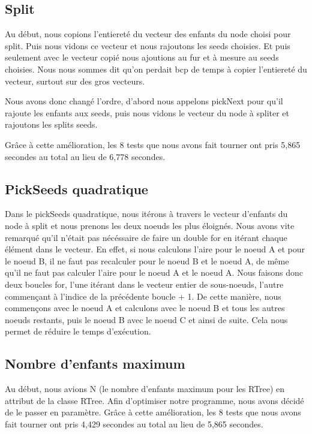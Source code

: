 \documentclass[utf8]{article}
\begin{document}
\begin{large}
  \subsection{Split}
  \indent

  \par
  Au début, nous copions l'entiereté du vecteur des enfants du node choisi pour
  split. Puis nous vidons ce vecteur et nous rajoutons les seeds choisies. Et puis
  seulement avec le vecteur copié nous ajoutions au fur et à mesure au seeds
  choisies. Nous nous sommes dit qu'on perdait bcp de temps à copier l'entiereté
  du vecteur, surtout sur des gros vecteurs.

  Nous avons donc changé l'ordre, d'abord nous appelons pickNext pour qu'il
  rajoute les enfants aux seeds, puis nous vidons le vecteur du node à spliter et
  rajoutons les splits seeds.

  Grâce à cette amélioration, les 8 tests que nous avons fait tourner ont pris
  5,865 secondes au total au lieu de 6,778 secondes.
  \par
  \subsection{PickSeeds quadratique}
  \indent
  \par
  Dans le pickSeeds quadratique, nous itérons à travers le vecteur d'enfants du node à
  split et nous prenons les deux noeuds les plus éloignés. Nous avons vite
  remarqué qu'il n'était pas nécéssaire de faire un double for en itérant chaque
  élément dans le vecteur. En effet, si nous calculons l'aire pour le noeud A
  et pour le noeud B, il ne faut pas recalculer pour le noeud B et le noeud A, de
  même qu'il ne faut pas calculer l'aire pour le noeud A et le noeud A. Nous
  faisons donc deux boucles for, l'une itérant dans le vecteur entier de
  sous-noeuds, l'autre commençant à l'indice de la précédente boucle + 1. De cette
  manière, nous commençons avec le noeud A et calculons avec le noeud B et tous
  les autres noeuds restants, puis le noeud B avec le noeud C et ainsi de suite. Cela nous permet de réduire le temps d'exécution.

  \subsection{Nombre d'enfants maximum}
  \indent
  \par
  Au début, nous avions N (le nombre d'enfants maximum pour les RTree) en
  attribut de la classe RTree. Afin d'optimiser notre programme, nous avons
  décidé de le passer en paramètre. Grâce à cette amélioration, les 8 tests que
  nous avons fait tourner ont pris 4,429 secondes au total au lieu de 5,865
  secondes.



\end{large}
\end{document}
